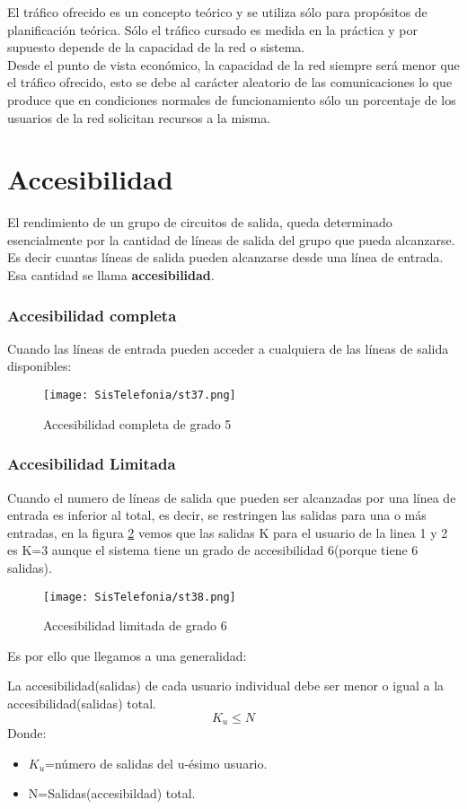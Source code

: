 \documentclass[
	12pt, %
	fleqn, %
	a4paper, %
	oneside, %
]{LegrandOrangeBook}
\begin{document}
El tráfico ofrecido es un concepto teórico y se utiliza sólo para propósitos de planificación teórica. Sólo el tráfico cursado es medida en la práctica y por supuesto depende de la capacidad de la red o sistema.\\
Desde el punto de vista económico, la capacidad de la red siempre será menor que el tráfico ofrecido, esto se debe al carácter aleatorio de las comunicaciones lo que produce que en condiciones normales de funcionamiento sólo un porcentaje de los usuarios de la red solicitan recursos a la misma.
\section{Accesibilidad}
El rendimiento de un grupo de circuitos de salida, queda determinado esencialmente por la cantidad de líneas de salida del grupo que pueda alcanzarse.\\
Es decir cuantas líneas de salida pueden alcanzarse desde una línea de entrada. Esa cantidad se llama \textbf{accesibilidad}.
\subsubsection{Accesibilidad completa}
Cuando las líneas de entrada pueden acceder a cualquiera de las líneas de salida disponibles:
\begin{figure}[ht]
\centering\texttt{[image: SisTelefonia/st37.png]}
\caption{Accesibilidad completa de grado 5}
\label{fig:Accesibilidad completa}
\end{figure}
\subsubsection{Accesibilidad Limitada}
Cuando el numero de líneas de salida que pueden ser alcanzadas por una línea de entrada es inferior al total, es decir, se restringen las salidas para una o más entradas, en la figura \ref{fig:Accesibilidad limitada} vemos que las salidas K para el usuario de la linea 1 y 2 es K=3 aunque el sistema tiene un grado  de accesibilidad 6(porque tiene 6 salidas).
\begin{figure}[ht]
\centering\texttt{[image: SisTelefonia/st38.png]}
\caption{Accesibilidad limitada de grado 6}
\label{fig:Accesibilidad limitada}
\end{figure}
Es por ello que llegamos a una generalidad:
\begin{definition}
La accesibilidad(salidas) de cada usuario individual debe ser menor o igual a la accesibilidad(salidas) total.
\begin{equation}
K_u\leq N
\end{equation}
Donde:
\begin{itemize}
\item $K_u$=número de salidas del u-ésimo usuario.
\item N=Salidas(accesibildad) total.
\end{itemize}
\end{definition}
\end{document}
